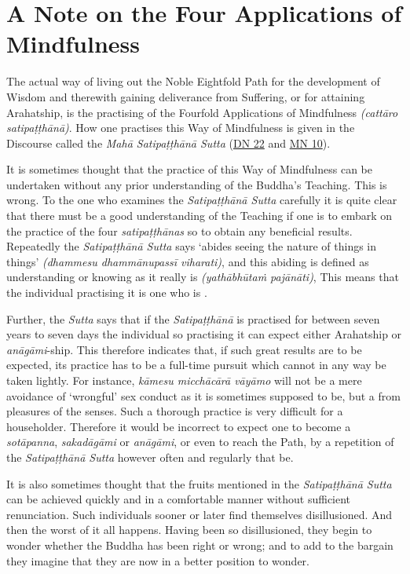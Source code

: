 \chapter{A Note on the Four Applications of Mindfulness}

\label{ch-16-start}The actual way of living out the Noble Eightfold Path for the development of Wisdom and therewith gaining deliverance from Suffering, or for attaining Arahatship, is the practising of the Fourfold Applications of Mindfulness \emph{(cattāro satipaṭṭhānā)}. How one practises this Way of Mindfulness is given in the Discourse called the \emph{Mahā Satipaṭṭhānā Sutta} (\href{https://suttacentral.net/dn22/en/sujato}{DN 22} and \href{https://suttacentral.net/mn10/en/sujato}{MN 10}).

It is sometimes thought that the practice of this Way of Mindfulness can be undertaken without any prior understanding of the Buddha's Teaching. This is wrong. To the one who examines the \emph{Satipaṭṭhānā Sutta} carefully it is quite clear that there must be a good understanding of the Teaching if one is to embark on the practice of the four \emph{satipaṭṭhānas} so to obtain any beneficial results. Repeatedly the \emph{Satipaṭṭhānā Sutta} says `abides seeing the nature of things in things' \emph{(dhammesu dhammānupassī viharati)}, and this abiding is defined as understanding or knowing as it really is \emph{(yathābhūtaṁ pajānāti)}, This means that the individual practising it is one who is .

Further, the \emph{Sutta} says that if the \emph{Satipaṭṭhānā} is practised for between seven years to seven days the individual so practising it can expect either Arahatship or \emph{anāgāmi}-ship. This therefore indicates that, if such great results are to be expected, its practice has to be a full-time pursuit which cannot in any way be taken lightly. For instance, \emph{kāmesu micchācārā vāyāmo} will not be a mere avoidance of `wrongful' sex conduct as it is sometimes supposed to be, but a  from  pleasures of the senses. Such a thorough practice is very difficult for a householder. Therefore it would be incorrect to expect one to become a \emph{sotāpanna}, \emph{sakadāgāmi} or \emph{anāgāmi}, or even to reach the Path, by a repetition of the \emph{Satipaṭṭhānā Sutta} however often and regularly that be.

It is also sometimes thought that the fruits mentioned in the \emph{Satipaṭṭhānā Sutta} can be achieved quickly and in a comfortable manner without sufficient renunciation. Such individuals sooner or later find themselves disillusioned. And then the worst of it all happens. Having been so disillusioned, they begin to wonder whether the Buddha has been right or wrong; and to add to the bargain they imagine that they are now in a better position to wonder.

